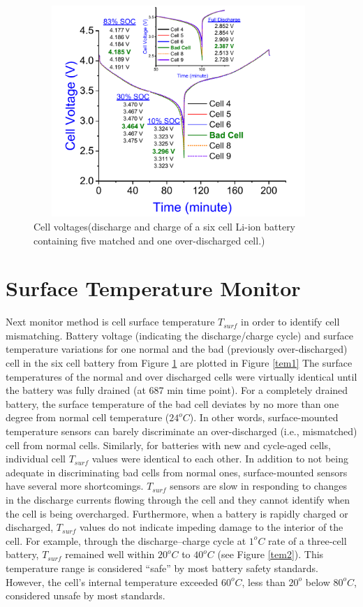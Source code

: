 \begin{figure}
	\includegraphics[width=11cm,height=8cm]{figures/emf_monitor.png}
	\centering
	\caption{
		Cell voltages(discharge and charge of a six cell Li-ion battery containing five matched and one over-discharged cell.)}\label{emf1}
\end{figure}

\section{Surface Temperature Monitor}

\hspace{0.5cm}
Next monitor method is cell surface temperature $T_{surf}$ in order to identify cell mismatching. Battery voltage (indicating the discharge{/}charge cycle) and surface temperature variations for one normal and the bad (previously over-discharged) cell in the six cell battery from Figure \ref{emf1} are plotted in Figure \ref{tem1} The surface temperatures of the normal and over discharged cells were virtually identical until the battery was fully drained (at 687 min time point). For a completely drained battery, the surface temperature of the bad cell deviates by no more than one degree from normal cell temperature ($24^oC$). In other words, surface-mounted temperature sensors can barely discriminate an over-discharged (i.e., mismatched) cell from normal cells. Similarly, for batteries with new and cycle-aged cells, individual cell $T_{surf}$ values were identical to each other. In addition to not being adequate in discriminating bad cells from normal ones, surface-mounted sensors have several more shortcomings. $T_{surf}$ sensors are slow in responding to changes in the discharge currents flowing through the cell and they cannot identify when the cell is being overcharged. Furthermore, when a battery is rapidly charged or discharged, $T_{surf}$ values do not indicate impeding damage to the interior of the cell. For example, through the discharge–charge cycle at $1^oC$ rate of a three-cell battery, $T_{surf}$ remained well within $20^oC$ to $40^oC$ (see Figure \ref{tem2}). This temperature range is considered “safe” by most battery safety standards. However, the cell’s internal temperature exceeded $60^oC$, less than $20^o$ below $80^oC$, considered unsafe by most standards.

